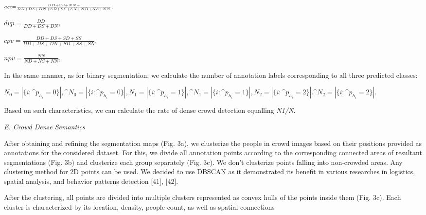 \documentclass{article}
\begin{document}
\begin{multicols}{2}
\begin{centering}
\begin{math}
\\
\scriptstyle
    acc = \frac{DD+SS+NN+}{DD+DS+DN+SD+SS+SN+ND+NS+NN},
\end{math}
\par
\begin{math}
\scriptstyle
    dvp = \frac{DD}{DD+DS+DN},
\end{math}
\par
\begin{math}
\scriptstyle
    cpv = \frac{DD+DS+SD+SS}{DD+DS+DN+SD+SS+SN},
\end{math}
\par
\begin{math}
\scriptstyle
    npv = \frac{NN}{ND+NS+NN},
    
\end{math}
\end{centering}

\columnbreak
In the same manner, as for binary segmentation, we 
calculate the number of annotation labels corresponding 
to all three predicted classes:
\begin{centering}
\begin{math}
  N_0=|\{i : \^p _h_i=0\}|,

 \^N_0=|\{i : \^p _h_i=0\}|,

 N_1=|\{i : \^p _h_i=1\}|,

 \^N_1=|\{i : \^p _h_i=1\}|,

 N_2=|\{i : \^p _h_i=2\}|.

 \^N_2=|\{i : \^p _h_i=2\}|.
  
\end{math}
\end{centering}
Based on such characteristics, we can calculate the rate 
of dense crowd detection equalling \textit{N1/\^N}.
\par
\vspace{2mm}
\textit{E. Crowd Dense Semantics}
\vspace{2mm}
\par
After obtaining and refining the segmentation maps 
(Fig. 3a), we clusterize the people in crowd images 
based on their positions provided as annotations for the 
considered dataset. For this, we divide all annotation 
points according to the corresponding connected areas 
of resultant segmentations (Fig. 3b) and clusterize each 
group separately (Fig. 3c). We don’t clusterize points 
falling into non-crowded areas. Any clustering method 
for 2D points can be used. We decided to use DBSCAN 
as it demonstrated its benefit in various researches in 
logistics, spatial analysis, and behavior patterns detection [41], [42].

After the clustering, all points are divided into multiple 
clusters represented as convex hulls of the points inside 
them (Fig. 3c). Each cluster is characterized by its location, density, people count, as well as spatial connections
\end{multicols}
\end{document}
